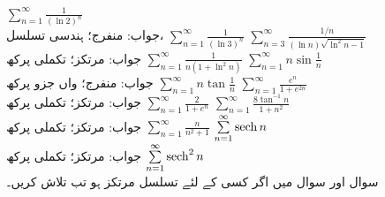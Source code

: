 $\sum\limits_{n=1}^{\infty}\frac{1}{(\ln 2)^n}$\\
جواب:\quad
منفرج؛ ہندسی تسلسل، 
$\sum\limits_{n=1}^{\infty}\frac{1}{(\ln 3)^n}$
$\sum\limits_{n=3}^{\infty}\frac{1/n}{(\ln n)\sqrt{\ln^2 n-1}}$\\
جواب:\quad
مرتکز؛  تکملی پرکھ
$\sum\limits_{n=1}^{\infty}\frac{1}{n(1+\ln^2n)}$
$\sum\limits_{n=1}^{\infty}n\sin\frac{1}{n}$\\
جواب:\quad
منفرج؛  واں جزو پرکھ
$\sum\limits_{n=1}^{\infty}n\tan \frac{1}{n}$
$\sum\limits_{n=1}^{\infty}\frac{e^n}{1+e^{2n}}$\\
جواب:\quad
مرتکز؛ تکملی پرکھ
$\sum\limits_{n=1}^{\infty}\frac{2}{1+e^n}$
$\sum\limits_{n=1}^{\infty}\frac{8\tan^{-1}n}{1+n^2}$\\
جواب:\quad
مرتکز؛ تکملی پرکھ
$\sum\limits_{n=1}^{\infty}\frac{n}{n^2+1}$
$\sum\limits_{n=1}^{\infty}\operatorname{sech} n$\\
جواب:\quad
مرتکز؛ تکملی پرکھ
$\sum\limits_{n=1}^{\infty}\operatorname{sech}^2 n$
\\
سوال  اور سوال  میں اگر کسی  کے لئے تسلسل مرتکز ہو تب  تلاش کریں۔ 


